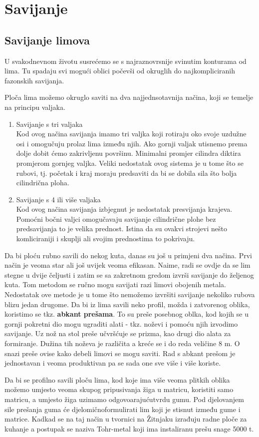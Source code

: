 \documentclass[a4paper,12pt]{article}
\numberwithin{figure}{section}
\begin{document}
\section{Savijanje}
\subsection{Savijanje limova}
U svakodnevnom životu susrećemo se s najraznovrsnije svinutim konturama od lima. Tu spadaju svi mogući oblici počevši od okruglih do najkompliciranih fazonskih savijanja. \par
Ploča lima možemo okruglo saviti na dva najjednsotavnija načina, koji se temelje na principu valjaka.
\begin{enumerate}
\item Savijanje s tri valjaka \\
Kod ovog načina savijanja imamo tri valjka koji rotiraju oko svoje uzdužne osi i omogučuju prolaz lima između njih. Ako gornji valjak utisnemo prema dolje dobit ćemo zakrivljenu površinu. Minimalni promjer cilindra diktira promjerom gornjeg valjka. Veliki nedostatak ovog sistema je u tome što se rubovi, tj. početak i kraj moraju predsaviti da bi se dobila sila što bolja cilindrična ploha.
\item Savijanje s 4 ili više valjaka \\
Kod ovog načina savijanja izbjegnut je nedostatak presvijanja krajeva. Pomoćni bočni valjci omogučavaju savijanje cilindrične plohe bez predsavijanja to je velika prednost. Istina da su ovakvi strojevi nešto komliciraniji i skuplji ali svojim prednostima to pokrivaju.
\end{enumerate}
Da bi ploću rubno savili do nekog kuta, danas su još u primjeni dva načina. Prvi način je veoma star ali još uvijek veoma efikasan. Naime, radi se ovdje da se lim stegne u dvije čeljusti i zatim se sa zakretnom gredom izvrši savijanje do željenog kuta. Tom metodom se ručno mogu savijati razi limovi obojenih metala. Nedostatak ove metode je u tome što nemožemo izvršiti savijanje nekoliko rubova blizu jedan drugome. Da bi iz lima savili neko profil, možda i zatvorenog oblika, koristimo se tkz. \textbf{abkant prešama}. To su preše posebnog oblka, kod kojih se u gornji pokretni dio mogu ugraditi alati - tkz. noževi i pomoću njih izvodimo savijanje. Uz nož na stol preše učvršćuje se prizma, kao drugi dio alata za formiranje. Dužina tih noževa je različita a kreće se i do reda veličine 8 m. O snazi preše ovise kako debeli limovi se mogu saviti. Rad s abkant prešom je jednostavan i veoma produktivan pa se sada one sve više i više koriste.\par
Da bi se profilno savili ploču lima, kod koje ima više veoma plitkih oblika možemo umjesto veoma skupog pripusivanja žiga u matricu, koristiti samo matricu, a umjesto žiga uzimamo odgovoarajućutvrdu gumu. Pod djelovanjem sile prešanja guma će djelomičnoformulirati lim koji je stisnut između gume i matrice. Kadkad se na taj način u tvornici na Žitnjaku izrađuju radne ploče za kuhanje a postupak se naziva Tohr-metal koji ima instaliranu prešu snage 5000 t.
\end{document}
